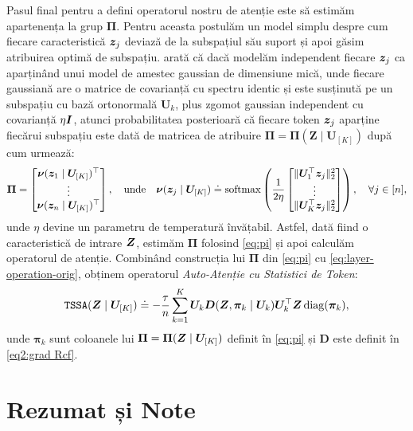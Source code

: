 \documentclass[../../book-main_ro.tex]{subfiles}
\begin{document}
Pasul final pentru a defini operatorul nostru de atenție este să estimăm apartenența la grup $\bm\Pi$. Pentru aceasta postulăm un model simplu despre cum fiecare caracteristică \(\bm{z}_{j}\) deviază de la subspațiul său suport și apoi găsim atribuirea optimă de subspațiu. \cite{yu2023white} arată că dacă modelăm independent fiecare \(\bm{z}_{j}\) ca aparținând unui model de amestec gaussian de dimensiune mică, unde fiecare gaussiană are o matrice de covarianță cu spectru identic și este susținută pe un subspațiu cu bază ortonormală \(\bm U_{k}\), plus zgomot gaussian independent cu covarianță \(\eta \bm{I}\), atunci probabilitatea posterioară că fiecare token \(\bm{z}_{j}\) aparține fiecărui subspațiu este dată de matricea de atribuire \(\bm \Pi = \bm \Pi(\bm Z \mid \bm U_{[K]})\) după cum urmează:
\begin{align}\label{eq:pi}
    \bm \Pi = \begin{bmatrix} \boldsymbol{\nu}(\bm{z}_1 \mid \bm U_{[K]})^\top \\ \vdots \\ \boldsymbol{\nu}(\bm{z}_n \mid \bm U_{[K]})^\top \end{bmatrix}, \quad
\text{unde} \quad 
\boldsymbol{\nu}(\bm{z}_j \mid \bm U_{[K]}) \doteq \operatorname{softmax}\left( \frac{1}{2\eta} \begin{bmatrix} \|  \bm U_{1}^{\top} \bm{z}_j \|_2^2 \\ \vdots \\ \| \bm U_{K}^{\top} \bm{z}_j \|_2^2 \end{bmatrix} \right), \quad \forall j \in [n],
\end{align}
unde $\eta$ devine un parametru de temperatură învățabil. Astfel, dată fiind o caracteristică de intrare \(\bm{Z}\), estimăm \(\bm\Pi\) folosind \eqref{eq:pi} și apoi calculăm operatorul de atenție. Combinând construcția lui $\bm\Pi$ din \eqref{eq:pi} cu
\eqref{eq:layer-operation-orig}, obținem operatorul {\em Auto-Atenție cu Statistici de Token}:
\begin{equation}
    \label{eq:tssa}
   \texttt{TSSA}(\bm{Z} \mid \bm U_{[K]}) \doteq -\frac{\tau}{n}\sum_{k = 1}^{K}\bm U_{k}\bm D(\bm{Z}, \bm\pi_{k} \mid \bm U_{k})\bm U_{k}^{\top}\bm{Z}\operatorname{diag}(\bm \pi_{k}),
\end{equation}
unde \(\bm\pi_{k}\) sunt coloanele lui \(\bm\Pi = \bm\Pi(\bm{Z} \mid \bm U_{[K]})\) definit în \eqref{eq:pi} și \(\bm D\) este definit în \eqref{eq2:grad Rcf}.




\section{Rezumat și Note}
\end{document}
